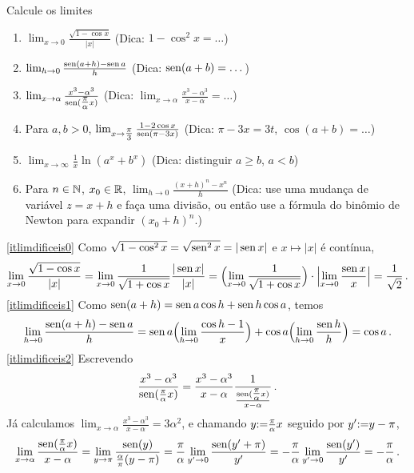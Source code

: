 \begin{exo}\label{Exo:LimitescomDicas}
Calcule os limites 
\begin{enumerate}
\item\label{itlimdificeis0} $\lim_{x\to 0}\frac{\sqrt{1-\cos x}}{|x|}$ (Dica:
$1-\cos^2 x=\dots$) 
\item\label{itlimdificeis1} $\lim_{h\to 0}\frac{\operatorname{sen} (a+h)-\operatorname{sen} a}{h}$ (Dica:
$\operatorname{sen} (a+b)=\dots$)
\item\label{itlimdificeis2} $\lim_{x\to \alpha}\frac{x^3-\alpha^3}{\operatorname{sen}
(\tfrac{\pi}{\alpha}x)}$ (Dica: $\lim_{x\to
\alpha}\frac{x^3-\alpha^3}{x-\alpha}=\dots$)
\item\label{itlimdificeis3} Para $a,b>0$, $\lim_{x\to \tfrac{\pi}{3}}\frac{1-2\cos
x}{\operatorname{sen}(\pi-3x)}$ (Dica: $\pi-3x=3t$, $\cos (a+b)=\dots$)
\item\label{itlimdificeis34} $\lim_{x\to\infty}\frac1x\ln(a^x+b^x)$ (Dica:
distinguir $a\geq b$, $a<b$)
\item\label{itlimdificeis37}
Para $n\in \mathbb{N}$, $x_0\in \mathbb{R}$, 
$\lim_{h\to 0}\frac{(x+h)^n-x^n}{h}$ 
(Dica: use uma mudança de variável $z=x+h$ e faça uma
divisão, ou então
use a fórmula do binômio de Newton para expandir $(x_0+h)^n$.)
\end{enumerate}
\begin{sol}
\eqref{itlimdificeis0} Como $\sqrt{1-\cos^2x}=\sqrt{\operatorname{sen}^2x}=|\operatorname{sen} x|$ e
$x\mapsto |x|$ é contínua,
$$\lim_{x\to 0}\frac{\sqrt{1-\cos x}}{|x|}=\lim_{x\to
0}\frac{1}{\sqrt{1+\cos x}}\frac{|\operatorname{sen} x|}{|x|}
=\Bigl(\lim_{x\to 0}\frac{1}{\sqrt{1+\cos x}}\Bigr)
\cdot \Bigl|
\lim_{x\to 0}\frac{\operatorname{sen} x}{x}\Bigr|=\frac{1}{\sqrt{2}}\,.
$$
\eqref{itlimdificeis1} Como $\operatorname{sen} (a+h)=\operatorname{sen} a\cos h+\operatorname{sen} h\cos a$, temos
$$
\lim_{h\to 0}\frac{\operatorname{sen} (a+h)-\operatorname{sen} a}{h}=\operatorname{sen} a \Bigl(\lim_{h\to 0}\frac{\cos
h-1}{x}\Bigr)+\cos a\Bigl(\lim_{h\to 0}\frac{\operatorname{sen} h}{h}\Bigr)=\cos a\,.
$$
\eqref{itlimdificeis2} Escrevendo 
$$
\frac{x^3-\alpha^3}{\operatorname{sen} (\tfrac{\pi}{\alpha}x)}=
\frac{x^3-\alpha^3}{x-\alpha}\frac{1}{\frac{\operatorname{sen}
(\tfrac{\pi}{\alpha}x)}{x-\alpha}}\,.
$$
Já calculamos $\lim_{x\to \alpha}\frac{x^3-\alpha^3}{x-\alpha}= 3\alpha^2$, e 
chamando $y{:=} \tfrac{\pi}{\alpha}x$ seguido por $y'{:=} y-\pi$,
$$\lim_{x\to \alpha}\frac{\operatorname{sen}(\tfrac{\pi}{\alpha}x)}{x-\alpha}
=\lim_{y\to \pi}\frac{\operatorname{sen}(y)}{\frac{\alpha}{\pi}(y-\pi)}
=\frac{\pi}{\alpha}\lim_{y'\to 0}\frac{\operatorname{sen}(y'+\pi)}{y'}
=-\frac{\pi}{\alpha}\lim_{y'\to 0}\frac{\operatorname{sen}(y')}{y'}=-\frac{\pi}{\alpha}\,.$$

\end{sol}
\end{exo}
